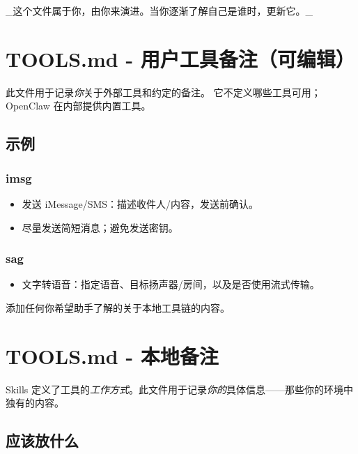 \hrulefill


\_这个文件属于你，由你来演进。当你逐渐了解自己是谁时，更新它。\_


\clearpage

\section{TOOLS.md - 用户工具备注（可编辑）}


此文件用于记录\textit{你}关于外部工具和约定的备注。
它不定义哪些工具可用；OpenClaw 在内部提供内置工具。

\subsection{示例}


\subsubsection{imsg}


\begin{itemize}
  \item 发送 iMessage/SMS：描述收件人/内容，发送前确认。
  \item 尽量发送简短消息；避免发送密钥。
\end{itemize}


\subsubsection{sag}


\begin{itemize}
  \item 文字转语音：指定语音、目标扬声器/房间，以及是否使用流式传输。
\end{itemize}


添加任何你希望助手了解的关于本地工具链的内容。


\clearpage

\section{TOOLS.md - 本地备注}


Skills 定义了工具的\textit{工作方式}。此文件用于记录\textit{你的}具体信息——那些你的环境中独有的内容。

\subsection{应该放什么}


